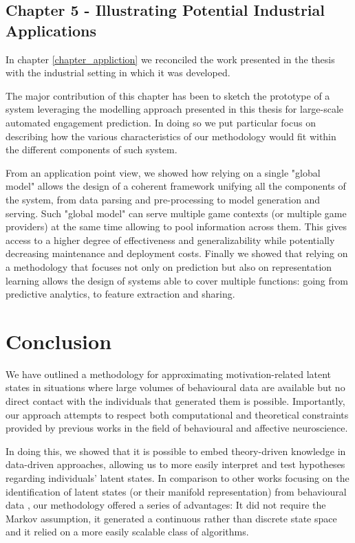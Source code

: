 \subsection{Chapter 5 - Illustrating Potential Industrial Applications}
\label{discussion_chapter_five}
In chapter \ref{chapter_appliction} we reconciled the work presented in the thesis with the industrial setting in which it was developed.

The major contribution of this chapter has been to sketch the prototype of a system leveraging the modelling approach presented in this thesis for large-scale automated engagement prediction. In doing so we put particular focus on describing how the various characteristics of our methodology would fit within the different components of such system.

From an application point view, we showed how relying on a single "global model" allows the design of a coherent framework unifying all the components of the system, from data parsing and pre-processing to model generation and serving. Such "global model" can serve multiple game contexts (or multiple game providers) at the same time allowing to pool information across them. This gives access to a higher degree of effectiveness and generalizability while potentially decreasing maintenance and deployment costs. Finally we showed that relying on a methodology that focuses not only on prediction but also on representation learning allows the design of systems able to cover multiple functions: going from predictive analytics, to feature extraction and sharing.

\section{Conclusion}
\label{conclusions}
We have outlined a methodology for approximating motivation-related latent states in situations where large volumes of behavioural data are available but no direct contact with the individuals that generated them is possible. Importantly, our approach attempts to respect both computational and theoretical constraints provided by previous works in the field of behavioural and affective neuroscience. 

In doing this, we showed that it is possible to embed theory-driven knowledge in data-driven approaches, allowing us to more easily interpret and test hypotheses regarding individuals' latent states. In comparison to other works focusing on the identification of latent states (or their manifold representation) from behavioural data \cite{calhoun2019unsupervised, luxem2020identifying, pereira2020quantifying, shi2021learning, mccullough2021unsupervised}, our methodology offered a series of advantages: It did not require the Markov assumption, it generated a continuous rather than discrete state space and it relied on a more easily scalable class of algorithms. 

